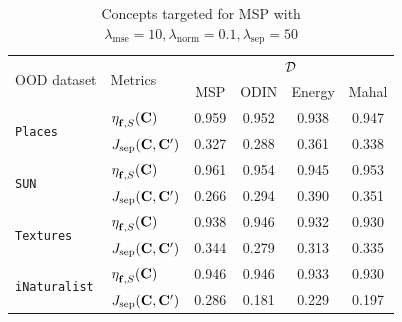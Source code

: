 \begin{table}[htb]
\begin{subtable}{.47\linewidth}
\begin{adjustbox}{width=\textwidth,center}
\begin{tabular}{l|l|c|c|c|c}
			\toprule
			\multirow{2}{0.35\linewidth}{OOD dataset} & \multirow{2}{0.06\linewidth}{Metrics} & \multicolumn{4}{c}{$\mathcal{D}$} \\ \cline{3-6}
    		& & MSP & ODIN & Energy & Mahal\\  \hline \hline
			\multirow{2}{0.08\linewidth}{\texttt{Places}} & $\eta^{}_{\mathbf{f}, S}(\mathbf{C})$ & 0.959 & 0.952 & 0.938 & 0.947\\ 
			& $J_{\textrm{sep}}(\mathbf{C}, \mathbf{C}')$ & 0.327 & 0.288 & 0.361 & 0.338 \\\hline 
            \multirow{2}{0.08\linewidth}{\texttt{SUN}} & $\eta^{}_{\mathbf{f}, S}(\mathbf{C})$ & 0.961 & 0.954 & 0.945 & 0.953 \\ 
			& $J_{\textrm{sep}}(\mathbf{C}, \mathbf{C}')$ & 0.266 & 0.294 & 0.390 & 0.351\\\hline 
			\multirow{2}{0.08\linewidth}{\texttt{Textures}} & $\eta^{}_{\mathbf{f}, S}(\mathbf{C})$ & 0.938 & 0.946 & 0.932 & 0.930\\ 
			& $J_{\textrm{sep}}(\mathbf{C}, \mathbf{C}')$ & 0.344 & 0.279 & 0.313 & 0.335\\\hline 
			\multirow{2}{0.08\linewidth}{\texttt{iNaturalist}} & $\eta^{}_{\mathbf{f}, S}(\mathbf{C})$ & 0.946 & 0.946 & 0.933 & 0.930\\ 
			& $J_{\textrm{sep}}(\mathbf{C}, \mathbf{C}')$ & 0.286 & 0.181 & 0.229 & 0.197\\
 \bottomrule
    \end{tabular}
    \end{adjustbox}
        \caption[]{Concepts targeted for MSP with $\lambda_\textrm{mse} = 10, \lambda_\textrm{norm} = 0.1, \lambda_\textrm{sep} = 50$}
    \label{tab:transferability-msp}
        \end{subtable}
    \hspace{\fill}
\begin{subtable}{.47\linewidth}
\begin{adjustbox}{width=\textwidth,center}


\end{adjustbox}
\end{subtable}
\end{table}
